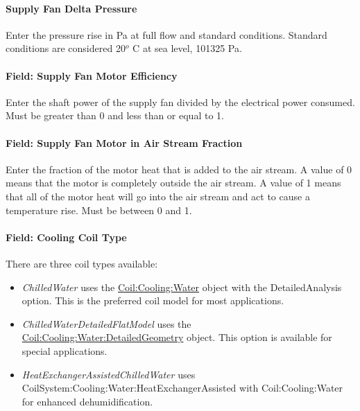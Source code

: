 \paragraph{Supply Fan Delta Pressure}\label{supply-fan-delta-pressure}

Enter the pressure rise in Pa at full flow and standard conditions. Standard conditions are considered 20\(^{o}\) C at sea level, 101325 Pa.

\paragraph{Field: Supply Fan Motor Efficiency}\label{field-supply-fan-motor-efficiency}

Enter the shaft power of the supply fan divided by the electrical power consumed. Must be greater than 0 and less than or equal to 1.

\paragraph{Field: Supply Fan Motor in Air Stream Fraction}\label{field-supply-fan-motor-in-air-stream-fraction}

Enter the fraction of the motor heat that is added to the air stream. A value of 0 means that the motor is completely outside the air stream. A value of 1 means that all of the motor heat will go into the air stream and act to cause a temperature rise. Must be between 0 and 1.

\paragraph{Field: Cooling Coil Type}\label{field-cooling-coil-type}

There are three coil types available:

\begin{itemize}
\item
  \emph{ChilledWater} uses the \hyperref[coilcoolingwater]{Coil:Cooling:Water} object with the DetailedAnalysis option. This is the preferred coil model for most applications.
\item
   \emph{ChilledWaterDetailedFlatModel} uses the \hyperref[coilcoolingwaterdetailedgeometry]{Coil:Cooling:Water:DetailedGeometry} object. This option is available for special applications.
\item
   \emph{HeatExchangerAssistedChilledWater} uses CoilSystem:Cooling:Water:HeatExchangerAssisted with Coil:Cooling:Water for enhanced dehumidification.
\end{itemize}

